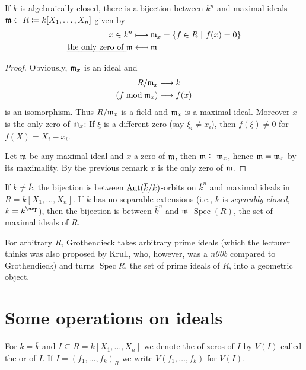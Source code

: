 \documentclass[a4paper,parskip=half,numbers=enddot, DIV=12]{scrreprt}
\begin{document}
	\begin{prop}
		If $k$ is algebraically closed, there is a bijection between $k^n$ and maximal ideals $\mathfrak{m}\subset R\coloneqq k[X_1,\ldots,X_n]$ given by
		\begin{align*}
		x\in k^n &\longmapsto \mathfrak{m}_x =\left\{f\in R\ \middle|\  f(x) =0\right\}\\
		\text{\emph{the only zero of }}\mathfrak{m} &\longmapsfrom \mathfrak{m}
		\end{align*}
	\end{prop}
	\begin{proof}
		Obviously, $\mathfrak{m}_x$ is an ideal and
		\begin{align*}
		R/\mathfrak{m}_x &\longrightarrow k\\
		(f\bmod \mathfrak{m}_x) &\longmapsto f(x)
		\end{align*}
		is an isomorphism. Thus $R/\mathfrak{m}_x$ is a field and $\mathfrak{m}_x$ is a maximal ideal. Moreover $x$ is the only zero of $\mathfrak{m}_x$: If $\xi$ is a different zero (say $\xi_i\neq x_i$), then $f(\xi)\neq 0$ for $f(X) = X_i-x_i$.
		
		Let $\mathfrak{m}$ be any maximal ideal and $x$ a zero of $\mathfrak{m}$, then $\mathfrak{m}\subseteq\mathfrak{m}_x$, hence $\mathfrak{m}=\mathfrak{m}_x$ by its maximality. By the previous remark $x$ is the only zero of $\mathfrak{m}$.
	\end{proof}
	\begin{rem}
		\begin{alphanumerate}
			\item If $k\neq\overline{k}$, the bijection is between $\operatorname{Aut}(\overline{k}/k)$-orbits on $\overline{k}^n$ and maximal ideals in $R=k[X_1,\ldots,X_n]$. If $k$ has no separable extensions (i.e., $k$ is \emph{separably closed}, $k=k^{\sep}$), then the bijection is between $\overline{k}^n$ and $\mathfrak{m}$-$\operatorname{Spec}(R)$, the set of maximal ideals of $R$.
			\item For arbitrary $R$, Grothendieck takes arbitrary prime ideals (which the lecturer thinks was also proposed by Krull, who, however, was a \emph{n00b} compared to Grothendieck) and turns $\operatorname{Spec} R$, the set of prime ideals of $R$, into a geometric object.
		\end{alphanumerate}
		
	\end{rem}
	
	
\section{Some operations on ideals}
	\begin{defi}
		For $k=\overline{k}$ and $I\subseteq R = k[X_1,\ldots,X_n]$ we denote the of zeros of $I$ by $V(I)$ called the  or  of $I$. If $I=(f_1,\ldots,f_k)_R$ we write $V(f_1,\ldots,f_k)$ for $V(I)$.
	\end{defi}
	
\end{document}

